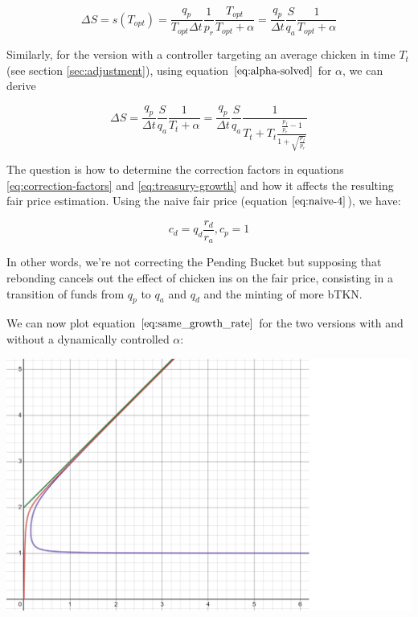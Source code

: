 \documentclass{article}
\begin{document}
\begin{equation}
  \label{}
  \Delta S = s(T_{opt}) = \frac{q_p}{T_{opt} \Delta t} \frac{1}{p_r} \frac{T_{opt}}{T_{opt}+\alpha} = \frac{q_p}{\Delta t} \frac{S}{q_a} \frac{1}{T_{opt}+\alpha}
\end{equation}

Similarly, for the version with a controller targeting an average chicken in time $T_t$ (see section \ref{sec:adjustment}), using equation $\ref{eq:alpha-solved}$ for $\alpha$, we can derive

\begin{equation}
  \label{}
  \Delta S = \frac{q_p}{\Delta t} \frac{S}{q_a} \frac{1}{T_t+\alpha}
  = \frac{q_p}{\Delta t} \frac{S}{q_a} \frac{1}{T_t+ T_t\frac{\frac{p_f}{p_r} - 1}{1 + \sqrt{\frac{p_f}{p_r}}}}  
\end{equation}



The question is how to determine the correction factors in equations \ref{eq:correction-factors} and \ref{eq:treasury-growth} and how it affects the resulting fair price estimation. Using the naive fair price (equation $\ref{eq:naive-4}$), we have:

\begin{equation}
  \label{}
   c_d=q_d \frac{r_d}{r_a}, c_p=1
\end{equation}

In other words, we're not correcting the Pending Bucket but supposing that rebonding cancels out the effect of chicken ins on the fair price, consisting in a transition of funds from $q_p$ to $q_a$ and $q_d$ and the minting of more bTKN.

We can now plot equation $\ref{eq:same_growth_rate}$ for the two versions with and without a dynamically controlled $\alpha$:

\includegraphics[width=\linewidth]{./ChickenBonds_Whitepaper_growth_price.png}
\end{document}
